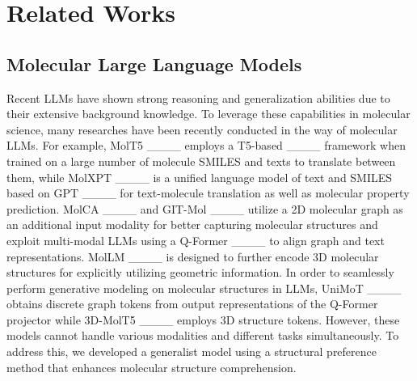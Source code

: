 \section{Related Works}
\label{sec:related_works}
\subsection{Molecular Large Language Models}
Recent LLMs have shown strong reasoning and generalization abilities due to their extensive background knowledge. To leverage these capabilities in molecular science, many researches have been recently conducted in the way of molecular LLMs. For example, MolT5 ____ employs a T5-based ____ framework when trained on a large number of molecule SMILES and texts to translate between them, while MolXPT ____ is a unified language model of text and SMILES based on GPT ____ for text-molecule translation as well as molecular property prediction. MolCA ____ and GIT-Mol ____ utilize a 2D molecular graph as an additional input modality for better capturing molecular structures and exploit multi-modal LLMs using a Q-Former ____ to align graph and text representations. MolLM ____ is designed to further encode 3D molecular structures for explicitly utilizing geometric information. In order to seamlessly perform generative modeling on molecular structures in LLMs, UniMoT ____ obtains discrete graph tokens from output representations of the Q-Former projector while 3D-MolT5 ____ employs 3D structure tokens.
However, these models cannot handle various modalities and different tasks simultaneously.
To address this, we developed a generalist model using a structural preference method that enhances molecular structure comprehension.

